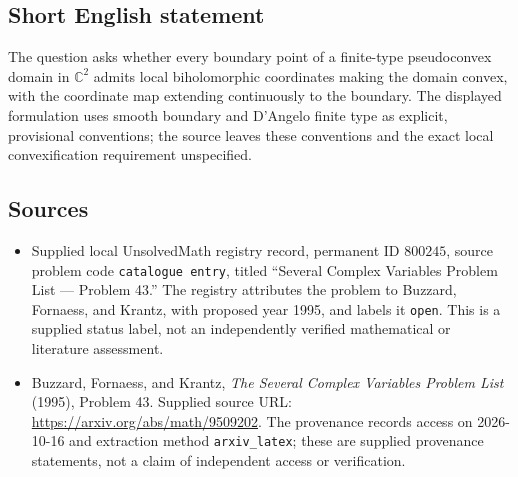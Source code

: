\documentclass[11pt]{article}
\newcommand{\C}{\mathbb{C}}
\begin{document}
\subsection{Short English statement}
The question asks whether every boundary point of a finite-type pseudoconvex domain in \(\C^2\) admits local biholomorphic coordinates making the domain convex, with the coordinate map extending continuously to the boundary. The displayed formulation uses smooth boundary and D'Angelo finite type as explicit, provisional conventions; the source leaves these conventions and the exact local convexification requirement unspecified.
\subsection{Sources}
\begin{itemize}
\item Supplied local UnsolvedMath registry record, permanent ID \(800245\), source problem code \texttt{catalogue entry}, titled ``Several Complex Variables Problem List --- Problem 43.'' The registry attributes the problem to Buzzard, Fornaess, and Krantz, with proposed year 1995, and labels it \texttt{open}. This is a supplied status label, not an independently verified mathematical or literature assessment.
\item Buzzard, Fornaess, and Krantz, \emph{The Several Complex Variables Problem List} (1995), Problem 43. Supplied source URL: \url{https://arxiv.org/abs/math/9509202}. The provenance records access on 2026-10-16 and extraction method \texttt{arxiv\_latex}; these are supplied provenance statements, not a claim of independent access or verification.
\end{itemize}
\end{document}

